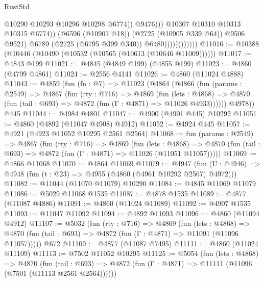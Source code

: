 \begin{lexlean}{RustStd}
\begin{coremodule}
                                            @10290
                                            @10293
                                            @10296
                                            @10298
                                            @6774))
                                        @9476)))
                                  @10307
                                  @10310
                                  @10313
                                  @10315
                                  @6774))
                              (@6596 (@10901 @18))
                              (@2725 (@10905 @339 @64))
                              @9506
                              @9521)
                            @6789
                            (@2725 (@6795 @399 @340))
                            @6480))))))))))))
@11016 := @10388 (@10446 (@10490 (@10532 (@10565 (@10613 (@10646 @11009))))))
@11017 := @4843 @199
@11021 := @4845 (@4849 @199) (@4855 @199)
@11023 := @4860 (@4799 @4861)
@11024 := @2556 @4141
@11026 := @4860 (@11024 @4888)
@11043 := @4859
    (fun (fn : @7) =>
    @11023
      (@4864
        (@4866
          (fun (params : @2549) =>
          @4867
            (fun (rty : @716) =>
            @4869
              (fun (lets : @4868) =>
              @4870 (fun (tail : @693) => @4872 (fun (Γ : @4871) => @11026 @4933))))))
        @4978))
    @445
@11044 := @4984 @4801
@11047 := @4900 (@4901 @445) @10292
@11051 := @4860 (@4892 (@11047 @4908) @4912)
@11052 := @4924 @445
@11057 := @4921 (@4923 @11052 @10295 @2561 @2564)
@11068 := fun (params : @2549) =>
  @4867
    (fun (rty : @716) =>
    @4869
      (fun (lets : @4868) =>
      @4870 (fun (tail : @693) => @4872 (fun (Γ : @4871) => @11026 (@11051 @11057)))))
@11069 := @4866 @11068
@11070 := @4864 @11069
@11079 := @4947
    (fun (U : @4946) => @4948 (fun (t : @23) => @4955 (@4860 (@4961 @10292 @2567) @4972)))
@11082 := @11044 (@11070 @11079) @10290
@11084 := @4845 @11069 @11079
@11086 := @5029 @11068 @1535
@11087 := @4878 @1535
@11089 := @4877 (@11087 @4886)
@11091 := @4860 (@11024 @11089)
@11092 := @4907 @1535
@11093 := @11047 @11092
@11094 := @4892 @11093
@11096 := @4860 (@11094 @4912)
@11107 := @5032
    (fun (rty : @716) =>
    @4869
      (fun (lets : @4868) =>
      @4870 (fun (tail : @693) => @4872 (fun (Γ : @4871) => @11091 (@11096 @11057)))))
    @672
@11109 := @4877 (@11087 @7495)
@11111 := @4860 (@11024 @11109)
@11113 := @7502 @11052 @10295
@11125 := @5054
    (fun (lets : @4868) =>
    @4870
      (fun (tail : @693) =>
      @4872 (fun (Γ : @4871) => @11111 (@11096 (@7501 (@11113 @2561 @2564))))))

\end{coremodule}
\end{lexlean}
